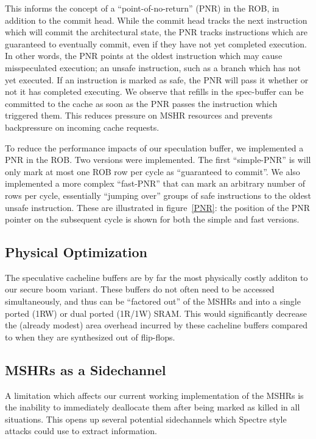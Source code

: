 This informs the concept of a ``point-of-no-return'' (PNR) in the ROB, in addition to the commit head. While the commit head tracks the next instruction which will commit the architectural state, the PNR tracks instructions which are guaranteed to eventually commit, even if they have not yet completed execution. In other words, the PNR points at the oldest instruction which may cause misspeculated execution; an unsafe instruction, such as a branch which has not yet executed. If an instruction is marked as safe, the PNR will pass it whether or not it has completed executing. We observe that refills in the spec-buffer can be committed to the cache as soon as the PNR passes the instruction which triggered them. This reduces pressure on MSHR resources and prevents backpressure on incoming cache requests.

To reduce the performance impacts of our speculation buffer, we implemented a PNR in the ROB. Two versions were implemented. The first ``simple-PNR'' is will only mark at most one ROB row per cycle as ``guaranteed to commit''. We also implemented a more complex ``fast-PNR'' that can mark an arbitrary number of rows per cycle, essentially ``jumping over'' groups of safe instructions to the oldest unsafe instruction. These are illustrated in figure~\ref{PNR}: the position of the PNR pointer on the subsequent cycle is shown for both the simple and fast versions.

\subsection{Physical Optimization}
The speculative cacheline buffers are by far the most physically costly additon to our secure boom variant. These buffers do not often need to be accessed simultaneously, and thus can be ``factored out'' of the MSHRs and into a single ported (1RW) or dual ported (1R/1W) SRAM. This would significantly decrease the (already modest) area overhead incurred by these cacheline buffers compared to when they are synthesized out of flip-flops.

\subsection{MSHRs as a Sidechannel}
A limitation which affects our current working implementation of the MSHRs is the inability to immediately deallocate them after being marked as killed in all situations. This opens up several potential sidechannels which Spectre style attacks could use to extract information.

